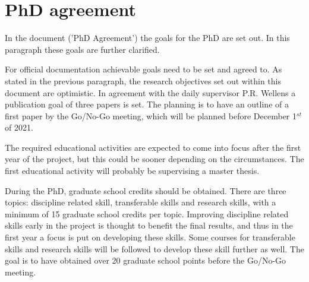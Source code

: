 \section{PhD agreement}
\label{sec:phd_agreement}
In the document ('PhD Agreement') the goals for the PhD are set out. In this paragraph these goals are further clarified.
\par 
For official documentation achievable goals need to be set and agreed to. As stated in the previous paragraph, the research objectives set out within this document are optimistic. In agreement with the daily supervisor P.R. Wellens a publication goal of three papers is set. The planning is to have an outline of a first paper by the Go/No-Go meeting, which will be planned before December 1\(^{st}\) of 2021. 
\par 
The required educational activities are expected to come into focus after the first year of the project, but this could be sooner depending on the circumstances. The first educational 
activity will probably be supervising a master thesis. 
\par 
During the PhD, graduate school credits should be obtained. There are three topics: discipline related skill, transferable skills and research skills, with a minimum of 15 graduate school credits per topic. Improving discipline related skills early in the project is thought to benefit the final results, and thus in the first year a focus is put on developing these skills. Some courses for transferable skills and research skills will be followed to develop these skill further as well. The goal is to have obtained over 20 graduate school points before the Go/No-Go meeting.
